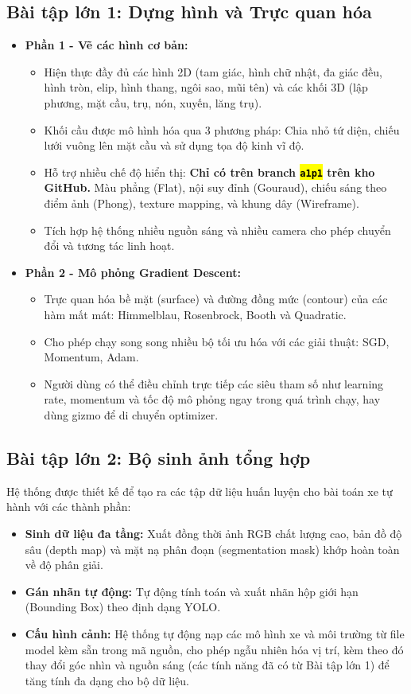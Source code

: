 \documentclass[a4paper]{article}
\newcommand{\code}[1]{\hl{\texttt{#1}}}
\begin{document}
\subsection{Bài tập lớn 1: Dựng hình và Trực quan hóa}
\hspace{12pt}
\begin{itemize}
  \item \textbf{Phần 1 - Vẽ các hình cơ bản:}
  \begin{itemize}
    \item Hiện thực đầy đủ các hình 2D (tam giác, hình chữ nhật, đa giác đều, hình tròn, elip, hình thang, ngôi sao, mũi tên) và các khối 3D (lập phương, mặt cầu, trụ, nón, xuyến, lăng trụ).
    \item Khối cầu được mô hình hóa qua 3 phương pháp: Chia nhỏ tứ diện, chiếu lưới vuông lên mặt cầu và sử dụng tọa độ kinh vĩ độ.
    \item Hỗ trợ nhiều chế độ hiển thị: \textbf{Chỉ có trên branch \code{a1p1} trên kho GitHub.} Màu phẳng (Flat), nội suy đỉnh (Gouraud), chiếu sáng theo điểm ảnh (Phong), texture mapping, và khung dây (Wireframe).
    \item Tích hợp hệ thống nhiều nguồn sáng và nhiều camera cho phép chuyển đổi và tương tác linh hoạt.
  \end{itemize}
  \item \textbf{Phần 2 - Mô phỏng Gradient Descent:}
  \begin{itemize}
    \item Trực quan hóa bề mặt (surface) và đường đồng mức (contour) của các hàm mất mát: Himmelblau, Rosenbrock, Booth và Quadratic.
    \item Cho phép chạy song song nhiều bộ tối ưu hóa với các giải thuật: SGD, Momentum, Adam.
    \item Người dùng có thể điều chỉnh trực tiếp các siêu tham số như learning rate, momentum và tốc độ mô phỏng ngay trong quá trình chạy, hay dùng gizmo để di chuyển optimizer.
  \end{itemize}
\end{itemize}

\subsection{Bài tập lớn 2: Bộ sinh ảnh tổng hợp}
\hspace{12pt}
Hệ thống được thiết kế để tạo ra các tập dữ liệu huấn luyện cho bài toán xe tự hành với các thành phần:
\begin{itemize}
  \item \textbf{Sinh dữ liệu đa tầng:} Xuất đồng thời ảnh RGB chất lượng cao, bản đồ độ sâu (depth map) và mặt nạ phân đoạn (segmentation mask) khớp hoàn toàn về độ phân giải.
  \item \textbf{Gán nhãn tự động:} Tự động tính toán và xuất nhãn hộp giới hạn (Bounding Box) theo định dạng YOLO.
  \item \textbf{Cấu hình cảnh:} Hệ thống tự động nạp các mô hình xe và môi trường từ file model kèm sẵn trong mã nguồn, cho phép ngẫu nhiên hóa vị trí, kèm theo đó thay đổi góc nhìn và nguồn sáng (các tính năng đã có từ Bài tập lớn 1) để tăng tính đa dạng cho bộ dữ liệu.
\end{itemize}
\end{document}
